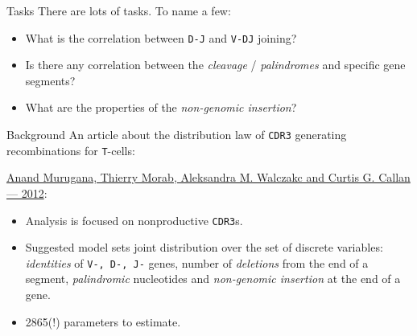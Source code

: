 \documentclass{beamer}\usepackage[]{graphicx}\usepackage[]{color}
\begin{document}
%  

\begin{frame}{Tasks}
  There are lots of tasks. To name a few:
  \begin{itemize}
    \item What is the correlation between \texttt{D-J} and \texttt{V-DJ} joining?
    \item Is there any correlation between the \textit{cleavage} / \textit{palindromes} and specific gene segments?  
    \item What are the properties of the \textit{non-genomic insertion}?
  \end{itemize}
\end{frame}

\begin{frame}{Background}
  An article about the distribution law of \texttt{CDR3} generating recombinations for \texttt{T}-cells:
  
  \href{http://www.pnas.org/content/109/40/16161.full}{%
  Anand Murugana, Thierry Morab, Aleksandra M. Walczakc and Curtis G. Callan --- 2012}:
  \begin{itemize}
    \item Analysis is focused on nonproductive \texttt{CDR3}s.
    \item Suggested model sets joint distribution over the set of discrete variables: \textit{identities} of \texttt{V-, D-, J-} genes, number of \textit{deletions} from the end of a segment, \textit{palindromic} nucleotides and \textit{non-genomic insertion} at the end of a gene.
    \pause
  \item {\color{blue} 2865(!) parameters to estimate.}
  \end{itemize}
\end{frame}
\end{document}
